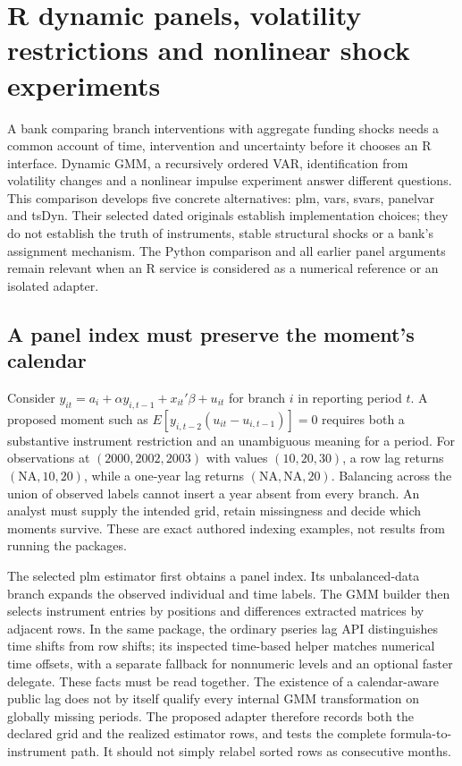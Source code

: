 \section[R dynamic panels and structural shocks]{R dynamic panels, volatility restrictions and nonlinear shock experiments}
\label{sec:exec25-r-dynamic}

A bank comparing branch interventions with aggregate funding shocks needs a common account of time, intervention and uncertainty before it chooses an R interface. Dynamic GMM, a recursively ordered VAR, identification from volatility changes and a nonlinear impulse experiment answer different questions. This comparison develops five concrete alternatives: plm, vars, svars, panelvar and tsDyn. Their selected dated originals establish implementation choices; they do not establish the truth of instruments, stable structural shocks or a bank's assignment mechanism. The Python comparison and all earlier panel arguments remain relevant when an R service is considered as a numerical reference or an isolated adapter.~\citep{exec25_rdyn_plm,exec25_rdyn_vars,exec25_rdyn_svars,exec25_rdyn_panelvar,exec25_rdyn_tsdyn,exec25_rdyn_choice}

\subsection{A panel index must preserve the moment's calendar}

Consider $y_{it}=a_i+\alpha y_{i,t-1}+x_{it}'\beta+u_{it}$ for branch $i$ in reporting period $t$. A proposed moment such as $E[y_{i,t-2}(u_{it}-u_{i,t-1})]=0$ requires both a substantive instrument restriction and an unambiguous meaning for a period. For observations at $(2000,2002,2003)$ with values $(10,20,30)$, a row lag returns $(\mathrm{NA},10,20)$, while a one-year lag returns $(\mathrm{NA},\mathrm{NA},20)$. Balancing across the union of observed labels cannot insert a year absent from every branch. An analyst must supply the intended grid, retain missingness and decide which moments survive. These are exact authored indexing examples, not results from running the packages.~\citep{exec25_rdyn_choice}

The selected plm estimator first obtains a panel index. Its unbalanced-data branch expands the observed individual and time labels. The GMM builder then selects instrument entries by positions and differences extracted matrices by adjacent rows. In the same package, the ordinary pseries lag API distinguishes time shifts from row shifts; its inspected time-based helper matches numerical time offsets, with a separate fallback for nonnumeric levels and an optional faster delegate. These facts must be read together. The existence of a calendar-aware public lag does not by itself qualify every internal GMM transformation on globally missing periods. The proposed adapter therefore records both the declared grid and the realized estimator rows, and tests the complete formula-to-instrument path. It should not simply relabel sorted rows as consecutive months.~\citep{exec25_rdyn_plm}

